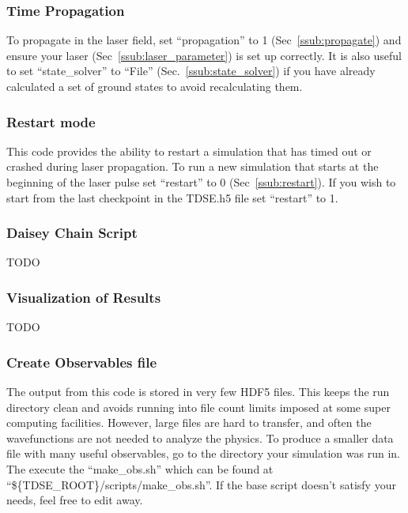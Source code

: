 \documentclass{article}
\begin{document}
\subsubsection{Time Propagation} %
\label{ssub:time_propagation}
To propagate in the laser field, set ``propagation'' to 1 (Sec~\ref{ssub:propagate}) and ensure your laser (Sec~\ref{ssub:laser_parameter}) is set up correctly. It is also useful to set ``state\_solver'' to ``File'' (Sec.~\ref{ssub:state_solver}) if you have already calculated a set of ground states to avoid recalculating them.

\subsubsection{Restart mode} %
\label{ssub:restart_mode}
This code provides the ability to restart a simulation that has timed out or crashed during laser propagation. To run a new simulation that starts at the beginning of the laser pulse set ``restart'' to 0 (Sec~\ref{ssub:restart}). If you wish to start from the last checkpoint in the TDSE.h5 file set ``restart'' to 1.

\subsubsection{Daisey Chain Script} %
\label{ssub:daisey_chain_script}
TODO

\subsubsection{Visualization of Results} %
\label{ssub:visualization_of_results}
TODO

\subsubsection{Create Observables file} %
\label{ssub:create_observables_file}
The output from this code is stored in very few HDF5 files. This keeps the run directory clean and avoids running into file count limits imposed at some super computing facilities. However, large files are hard to transfer, and often the wavefunctions are not needed to analyze the physics. To produce a smaller data file with many useful observables, go to the directory your simulation was run in. The execute the ``make\_obs.sh'' which can be found at ``\$\{TDSE\_ROOT\}/scripts/make\_obs.sh''. If the base script doesn't satisfy your needs, feel free to edit away.
\end{document}
